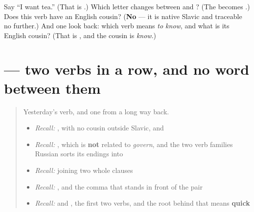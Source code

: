 \begin{tcolorbox}[breakable,colback=teal!4,colframe=teal!35!black,title={Before you move on}]
Say \textquotedblleft{}I want tea.\textquotedblright{} (That is \textbf{  }.) Which letter changes between \textbf{} and \textbf{}? (The \textbf{} becomes \textbf{}.) Does this verb have an English cousin? (\textbf{No} — it is native Slavic and traceable no further.) And one look back: which verb means \emph{to know}, and what is its English cousin? (That is \textbf{}, and the cousin is \emph{know}.)
\end{tcolorbox}
\section[\texorpdfstring{\ru{я} \ru{хочу} \ru{читать} (ya khachú chitát)}{я хочу читать (ya khachú chitát)}]{   — two verbs in a row, and no word between them}

\label{lesson:RU-C20-khochu-chitat}



\begin{quote}
Yesterday's verb, and one from a long way back.

\begin{itemize}
\raggedright
  \item \emph{Recall:} \emph{}, with no cousin outside Slavic, and \emph{ }
  \item \emph{Recall:} \emph{}, which is \textbf{not} related to \emph{govern}, and the two verb families Russian sorts its endings into
  \item \emph{Recall:} \emph{} joining two whole clauses
  \item \emph{Recall:} \emph{ }, and the comma that stands in front of the pair
  \item \emph{Recall:} \emph{} and \emph{}, the first two verbs, and the root behind \emph{} that means \textbf{quick}
\end{itemize}
\end{quote}

